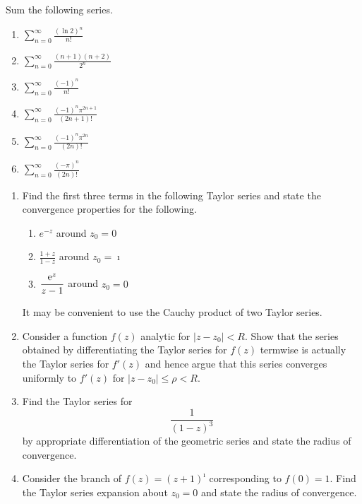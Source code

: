 {\begin{Exercise}
  \label{exercise sum taylor series}
  Sum the following series.
  \begin{enumerate}
  \item $\displaystyle \sum_{n = 0}^\infty \frac{(\ln 2)^n}{n!}$
  \item $\displaystyle \sum_{n = 0}^\infty \frac{ (n + 1) (n + 2) }{ 2^n }$
  \item $\displaystyle \sum_{n = 0}^\infty \frac{ (-1)^n }{ n! }$
  \item $\displaystyle \sum_{n = 0}^\infty \frac{ (-1)^n \pi^{2 n+1} }{ (2 n + 1)! }$
  \item $\displaystyle \sum_{n = 0}^\infty \frac{ (-1)^n \pi^{2 n} }{ (2 n)! }$
  \item $\displaystyle \sum_{n = 0}^\infty \frac{ (-\pi)^n }{ (2 n)! }$
  \end{enumerate}

\end{Exercise}


\begin{Exercise}
  \label{exercise 3 terms e-z}
  \begin{enumerate}
  \item 
    Find the first three terms in the following 
    Taylor series and state the convergence properties for the following.
    \begin{enumerate}
    \item 
      $\displaystyle e^{-z}$ around $z_0 = 0$
    \item 
      $\displaystyle \frac{1+z}{1-z}$ around $z_0 = \imath$
    \item 
      $\displaystyle \frac{\mathop{\mathrm{e}}\nolimits^z}{z-1}$ around $z_0 = 0$
    \end{enumerate}
    It may be convenient to use the Cauchy product of two Taylor
    series.
  \item 
    Consider a function $f(z)$ analytic for $|z - z_0| < R$.
    Show that the series obtained by differentiating the
    Taylor series for $f(z)$ termwise is actually the
    Taylor series for $f'(z)$ and hence argue that this 
    series converges uniformly to $f'(z)$ for 
    $|z-z_0|\leq \rho < R$.
  \item 
    Find the Taylor series for 
    \[
    \frac{1}{(1 - z)^3}
    \]
    by appropriate differentiation of the geometric series and 
    state the radius of convergence.
  \item 
    Consider the branch of $f(z) = (z + 1)^\imath$ 
    corresponding to $f(0) = 1$.  Find the Taylor series expansion 
    about $z_0 = 0$ and state the radius of convergence.
  \end{enumerate}


\end{Exercise}}
